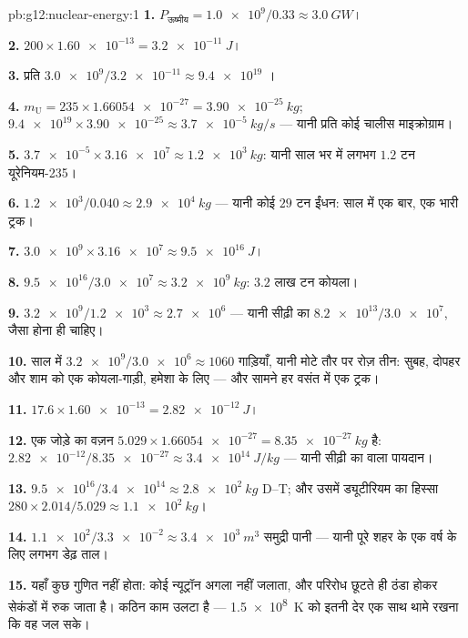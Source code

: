 \begin{solution}{pb:g12:nuclear-energy:1}
\textbf{1.} $P_{\text{ऊष्मीय}} = \num{1.0e9}/0.33 \approx \qty{3.0}{GW}$।

\textbf{2.} $200 \times \num{1.60e-13} = \qty{3.2e-11}{J}$।

\textbf{3.} प्रति  $\num{3.0e9}/\num{3.2e-11} \approx \num{9.4e19}$ ।

\textbf{4.} $m_{\mathrm U} = 235 \times \num{1.66054e-27} =
\qty{3.90e-25}{kg}$; $\num{9.4e19} \times \num{3.90e-25} \approx
\qty{3.7e-5}{kg/s}$ --- यानी प्रति  कोई चालीस माइक्रोग्राम।

\textbf{5.} $\num{3.7e-5} \times \num{3.16e7} \approx \qty{1.2e3}{kg}$: यानी साल भर में लगभग $1.2$ टन यूरेनियम-235।

\textbf{6.} $\num{1.2e3}/0.040 \approx \qty{2.9e4}{kg}$ --- यानी कोई $29$ टन ईंधन: साल में एक बार, एक भारी ट्रक।

\textbf{7.} $\num{3.0e9} \times \num{3.16e7} \approx \qty{9.5e16}{J}$।

\textbf{8.} $\num{9.5e16}/\num{3.0e7} \approx \qty{3.2e9}{kg}$: $3.2$ लाख टन कोयला।

\textbf{9.} $\num{3.2e9}/\num{1.2e3} \approx \num{2.7e6}$ --- यानी सीढ़ी का $\num{8.2e13}/\num{3.0e7}$, जैसा होना ही चाहिए।

\textbf{10.} साल में $\num{3.2e9}/\num{3.0e6} \approx 1060$ गाड़ियाँ, यानी मोटे तौर पर रोज़ तीन: सुबह, दोपहर
और शाम को एक कोयला-गाड़ी, हमेशा के लिए --- और सामने हर वसंत में एक ट्रक।

\textbf{11.} $17.6 \times \num{1.60e-13} = \qty{2.82e-12}{J}$।

\textbf{12.} एक जोड़े का वज़न $5.029 \times \num{1.66054e-27} =
\qty{8.35e-27}{kg}$ है: $\num{2.82e-12}/\num{8.35e-27} \approx
\qty{3.4e14}{J/kg}$ --- यानी सीढ़ी का
 वाला पायदान।

\textbf{13.} $\num{9.5e16}/\num{3.4e14} \approx \qty{2.8e2}{kg}$ D--T; और उसमें ड्यूटीरियम का हिस्सा $280 \times 2.014/5.029 \approx \qty{1.1e2}{kg}$।

\textbf{14.} $\num{1.1e2}/\num{3.3e-2} \approx \qty{3.4e3}{m^3}$ समुद्री पानी --- यानी पूरे शहर के एक वर्ष के लिए लगभग
डेढ़ ताल।

\textbf{15.} यहाँ कुछ गुणित नहीं होता: कोई न्यूट्रॉन अगला  नहीं
जलाता, और परिरोध छूटते ही  ठंडा होकर सेकंडों में रुक जाता है।
कठिन काम उलटा है --- \qty{1.5e8}{K} को इतनी देर एक साथ थामे रखना कि वह जल सके।


\end{solution}
